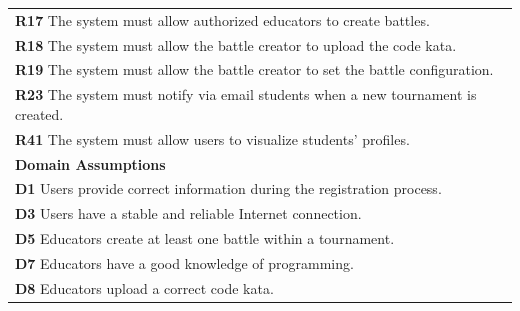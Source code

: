 \begin{table}[H]
\begin{tabularx}{\textwidth}{X}
        \textbf{R17} The system must allow authorized educators to create battles.        \\ 
        \textbf{R18} The system must allow the battle creator to upload the code kata.       \\
        \textbf{R19} The system must allow the battle creator to set the battle configuration.       \\ 
        \textbf{R23} The system must notify via email students when a new tournament is created.            \\
        \textbf{R41} The system must allow users to visualize students' profiles.     \\
        \midrule
        \textbf{Domain Assumptions}                                                                                                  \\ \midrule
        \textbf{D1} Users provide correct information during the registration process. \\   
        \textbf{D3} Users have a stable and reliable Internet connection. \\
        \textbf{D5} Educators create at least one battle within a tournament.        \\
        \textbf{D7} Educators have a good knowledge of programming.      \\
        \textbf{D8} Educators upload a correct code kata.        \\
        \bottomrule
    \end{tabularx}
\end{table}

